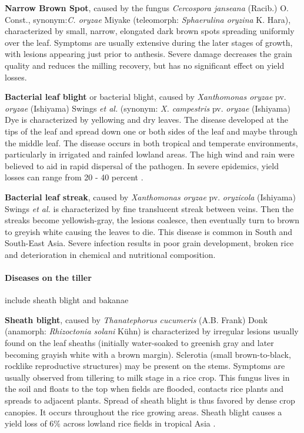 \documentclass[12pt, oneside]{report}
\begin{document}
\textbf{Narrow Brown Spot}, caused by the fungus \textit{Cercospora janseana} (Racib.) O. Const., synonym:\textit{C. oryzae} Miyake (teleomorph: \textit{Sphaerulina oryzina} K. Hara),  characterized by small, narrow, elongated dark brown spots spreading uniformly over the leaf. Symptoms are usually extensive during the later stages of growth, with lesions appearing just prior to anthesis. Severe damage decreases the grain quality and reduces the milling recovery, but has no significant effect on yield losses. 

\textbf{Bacterial leaf blight} or bacterial blight, caused by \textit{Xanthomonas oryzae} pv. \textit{oryzae} (Ishiyama) Swings \textit{et al.} (synonym: \textit{X. campestris} pv. \textit{oryzae} (Ishiyama) Dye is characterized by yellowing and dry leaves. The disease developed at the tips of the leaf and spread down one or both sides of the leaf and maybe through the middle leaf. The disease occurs in both tropical and temperate environments, particularly in irrigated and rainfed lowland areas. The high wind and rain were believed to aid in rapid dispersal of the pathogen. In severe epidemics, yield losses can range from 20 - 40 percent \citep{sonti1998bacterial}.

\textbf{Bacterial leaf streak}, caused by \textit{Xanthomonas oryzae} pv. \textit{oryzicola} (Ishiyama) Swings \textit{et al.} is characterized by fine translucent streak between veins. Then the streaks become yellowish-gray, the lesions coalesce, then eventually turn to brown to greyish white causing the leaves to die. This disease is common in South and South-East Asia. Severe infection results in poor grain development, broken rice and deterioration in chemical and nutritional composition. 

\paragraph{Diseases on the tiller} include sheath blight and bakanae 

\textbf{Sheath blight}, caused by \textit{Thanatephorus cucumeris} (A.B. Frank) Donk (anamorph: \textit{Rhizoctonia solani} K\"uhn) is characterized by irregular lesions usually found on the leaf sheaths (initially water-soaked to greenish gray and later becoming grayish white with a brown margin). Sclerotia (small brown-to-black, rocklike reproductive structures) may be present on the stems. Symptoms are usually observed from tillering to milk stage in a rice crop. This fungus lives in the soil and floats to the top when fields are flooded, contacts rice plants and spreads to adjacent plants. Spread of sheath blight is thus favored by dense crop canopies. It occurs throughout the rice growing areas. Sheath blight causes a yield loss of 6\%  across lowland rice fields in tropical Asia \cite{Savary:2006to}.
\end{document}
